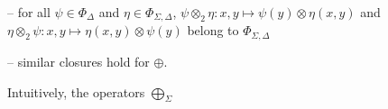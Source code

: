 \noindent --
for all $\psi \in \Phi_\Delta$ and $\eta \in \Phi_{\Sigma, \Delta}$,
$\psi \otimes_2 \eta: x, y \mapsto \psi(y) \otimes \eta(x, y)$ and\\
\phantom{--} $\eta \otimes_2 \psi: x, y \mapsto \eta(x, y) \otimes \psi(y)$
belong to $\Phi_{\Sigma, \Delta}$

\noindent --
similar closures hold for $\oplus$.


%
%
\noindent
Intuitively, the operators $\bigoplus_\Sigma$
